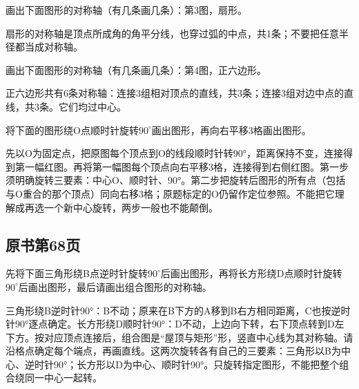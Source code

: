 画出下面图形的对称轴（有几条画几条）：第3图，扇形。\par
{}
\begin{BookAnswer}
扇形的对称轴是顶点所成角的角平分线，也穿过弧的中点，共1条；不要把任意半径都当成对称轴。
\end{BookAnswer}

画出下面图形的对称轴（有几条画几条）：第4图，正六边形。\par
{}
\begin{BookAnswer}
正六边形共有6条对称轴：连接3组相对顶点的直线，共3条；连接3组对边中点的直线，共3条。它们均过中心。
\end{BookAnswer}

将下面的图形绕O点顺时针旋转\(90^\circ\)画出图形，再向右平移3格画出图形。\par
{}
\begin{BookAnswer}
先以O为固定点，把原图每个顶点到O的线段顺时针转90°，距离保持不变，连接得到第一幅红图。再将第一幅图每个顶点向右平移3格，连接得到右侧红图。第一步须明确旋转三要素：中心O、顺时针、90°。第二步把旋转后图形的所有点（包括与O重合的那个顶点）同向右移3格；原题标定的O仍留作定位参照。不能把它理解成再选一个新中心旋转，两步一般也不能颠倒。
\end{BookAnswer}



\subsection*{原书第68页}

先将下面三角形绕B点逆时针旋转\(90^\circ\)后画出图形，再将长方形绕D点顺时针旋转\(90^\circ\)后画出图形，最后请画出组合图形的对称轴。\par
{}
\begin{BookAnswer}
三角形绕B逆时针90°：B不动；原来在B下方的A移到B右方相同距离，C也按逆时针90°逐点确定。长方形绕D顺时针90°：D不动，上边向下转，右下顶点转到D左下方。按对应顶点连接后，组合图是“屋顶与矩形”形，竖直中心线为其对称轴。请沿格点确定每个端点，再画直线。这两次旋转各有自己的三要素：三角形以B为中心、逆时针90°；长方形以D为中心、顺时针90°。只旋转指定图形，不能把整个组合绕同一中心一起转。
\end{BookAnswer}

